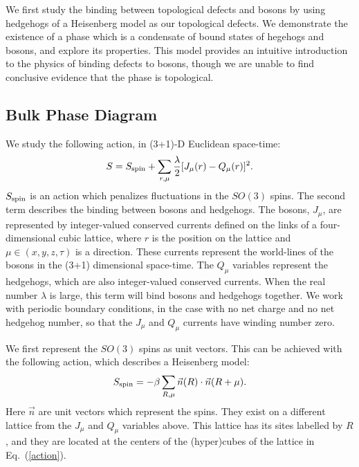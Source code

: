 \documentclass[prb,twocolumn]{revtex4-1}
\begin{document}
We first study the binding between topological defects and bosons by using hedgehogs of a Heisenberg model as our topological defects. We demonstrate the existence of a phase which is a condensate of bound states of hegehogs and bosons, and explore its properties. This model provides an intuitive introduction to the physics of binding defects to bosons, though we are unable to find conclusive evidence that the phase is topological.

\subsection{Bulk Phase Diagram}
\label{subsec::bulkheis}
We study the following action, in (3+1)-D Euclidean space-time:
\begin{equation}
S=S_{\rm spin}+\sum_{r,\mu} \frac{\lambda}{2}[ J_\mu(r)- Q_\mu(r)]^2.
\label{action}
\end{equation}
$S_{\rm spin}$ is an action which penalizes fluctuations in the $SO(3)$ spins. The second term describes the binding between bosons and hedgehogs. The bosons, $J_\mu$, are represented by integer-valued conserved currents defined on the links of a four-dimensional cubic lattice, where $r$ is the position on the lattice and $\mu\in (x,y,z,\tau)$ is a direction. These currents represent the world-lines of the bosons in the (3+1) dimensional space-time. The $Q_\mu$ variables represent the hedgehogs, which are also integer-valued conserved currents.  When the real number $\lambda$ is large, this term will bind bosons and hedgehogs together. We work with periodic boundary conditions, in the case with no net charge and no net hedgehog number, so that the $J_\mu$ and $Q_\mu$ currents have winding number zero.

We first represent the $SO(3)$ spins as unit vectors. This can be achieved with the following action, which describes a Heisenberg model:
\begin{equation}
S_{\rm spin}=-\beta\sum_{R,\mu} \vec{n}(R)\cdot \vec{n}(R+\mu).
\end{equation}
Here $\vec{n}$ are unit vectors which represent the spins. They exist on a different lattice from the $J_\mu$ and $Q_\mu$ variables above. This lattice has its sites labelled by $R$, and they are located at the centers of the (hyper)cubes of the lattice in Eq.~(\ref{action}). 
\end{document}
